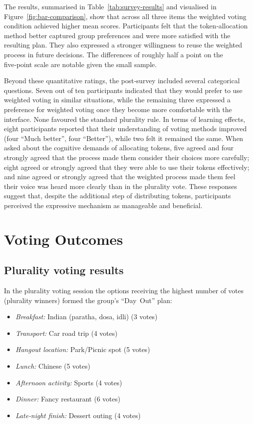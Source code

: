The results, summarised in Table~\ref{tab:survey-results} and visualised in Figure~\ref{fig:bar-comparison}, show that across all three items the weighted voting condition achieved higher mean scores.  Participants felt that the token‑allocation method better captured group preferences and were more satisfied with the resulting plan.  They also expressed a stronger willingness to reuse the weighted process in future decisions.  The differences of roughly half a point on the five‑point scale are notable given the small sample.

Beyond these quantitative ratings, the post‑survey included several categorical questions.  Seven out of ten participants indicated that they would prefer to use weighted voting in similar situations, while the remaining three expressed a preference for weighted voting once they become more comfortable with the interface.  None favoured the standard plurality rule.  In terms of learning effects, eight participants reported that their understanding of voting methods improved (four ``Much better'', four ``Better''), while two felt it remained the same.  When asked about the cognitive demands of allocating tokens, five agreed and four strongly agreed that the process made them consider their choices more carefully; eight agreed or strongly agreed that they were able to use their tokens effectively; and nine agreed or strongly agreed that the weighted process made them feel their voice was heard more clearly than in the plurality vote.  These responses suggest that, despite the additional step of distributing tokens, participants perceived the expressive mechanism as manageable and beneficial.

\section{Voting Outcomes}

\subsection*{Plurality voting results}

In the plurality voting session the options receiving the highest number of votes (plurality winners) formed the group’s ``Day~Out'' plan:

\begin{itemize}
    \item \emph{Breakfast:} Indian (paratha, dosa, idli) (3 votes)
    \item \emph{Transport:} Car road trip (4 votes)
    \item \emph{Hangout location:} Park/Picnic spot (5 votes)
    \item \emph{Lunch:} Chinese (5 votes)
    \item \emph{Afternoon activity:} Sports (4 votes)
    \item \emph{Dinner:} Fancy restaurant (6 votes)
    \item \emph{Late‑night finish:} Dessert outing (4 votes)
\end{itemize}


